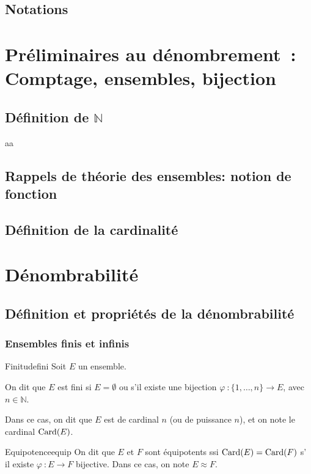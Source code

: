 \documentclass[a4paper,french,final]{memoir}
\begin{document}
\chapter{Notations}
\mainmatter
\part{Préliminaires au dénombrement~: Comptage, ensembles, bijection}
\chapter{\texorpdfstring{Définition de $\mathbb{N}$}{Définition de N}}
aa
\chapter{Rappels de théorie des ensembles: notion de fonction}
\diagbij
\chapter{Définition de la cardinalité}
\part{Dénombrabilité}
\chapter{Définition et propriétés de la dénombrabilité}

\section{Ensembles finis et infinis}

\begin{defb}{Finitude}{fini}
     Soit $E$ un ensemble. 
	    
	On dit que $E$ est fini si $E = \emptyset$ ou s'il existe une bijection $\varphi~: \{1,\dots,n \} \to E$, avec $n \in \mathbb{N}$. 
		
	Dans ce cas, on dit que $E$ est de cardinal $n$ (ou de puissance $n$), et on note le cardinal $\operatorname{Card}(E)$. 
\end{defb}

\begin{defb}{Equipotence}{equip}
    On dit que $E$ et $F$ sont équipotents ssi $\operatorname{Card}(E) = \operatorname{Card}(F)$ s' il existe $\varphi~: E \to F$ bijective. Dans ce cas, on note $E \mathrel{\approx} F$. 
\end{defb}
\end{document}
